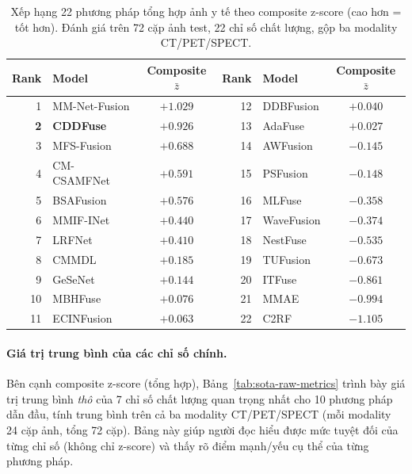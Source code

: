 \begin{table}[h]
\centering
\small
\caption{Xếp hạng 22 phương pháp tổng hợp ảnh y tế theo composite z-score (cao hơn = tốt hơn). Đánh giá trên 72 cặp ảnh test, 22 chỉ số chất lượng, gộp ba modality CT/PET/SPECT.}
\label{tab:zscore-ranking}
\begin{tabular}{rlc|rlc}
\toprule
\textbf{Rank} & \textbf{Model} & \textbf{Composite $\bar{z}$} & \textbf{Rank} & \textbf{Model} & \textbf{Composite $\bar{z}$} \\
\midrule
1  & MM-Net-Fusion          & $+1.029$ & 12 & DDBFusion         & $+0.040$ \\
\textbf{2}  & \textbf{CDDFuse} \cite{zhao2023cddfuse} & $\mathbf{+0.926}$ & 13 & AdaFuse           & $+0.027$ \\
3  & MFS-Fusion             & $+0.688$ & 14 & AWFusion          & $-0.145$ \\
4  & CM-CSAMFNet            & $+0.591$ & 15 & PSFusion          & $-0.148$ \\
5  & BSAFusion              & $+0.576$ & 16 & MLFuse            & $-0.358$ \\
6  & MMIF-INet              & $+0.440$ & 17 & WaveFusion        & $-0.374$ \\
7  & LRFNet                 & $+0.410$ & 18 & NestFuse          & $-0.535$ \\
8  & CMMDL                  & $+0.185$ & 19 & TUFusion          & $-0.673$ \\
9  & GeSeNet                & $+0.144$ & 20 & ITFuse            & $-0.861$ \\
10 & MBHFuse                & $+0.076$ & 21 & MMAE              & $-0.994$ \\
11 & ECINFusion             & $+0.063$ & 22 & C2RF              & $-1.105$ \\
\bottomrule
\end{tabular}
\end{table}

\paragraph{Giá trị trung bình của các chỉ số chính.}
Bên cạnh composite z-score (tổng hợp), Bảng~\ref{tab:sota-raw-metrics} trình bày giá trị trung bình \emph{thô} của 7 chỉ số chất lượng quan trọng nhất cho 10 phương pháp dẫn đầu, tính trung bình trên cả ba modality CT/PET/SPECT (mỗi modality 24 cặp ảnh, tổng 72 cặp). Bảng này giúp người đọc hiểu được mức tuyệt đối của từng chỉ số (không chỉ z-score) và thấy rõ điểm mạnh/yếu cụ thể của từng phương pháp.

